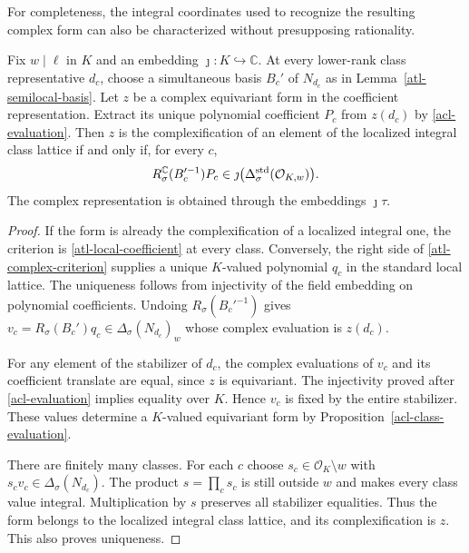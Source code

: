 For completeness, the integral coordinates used to
recognize the resulting complex form can also be
characterized without presupposing rationality.

\begin{proposition}\label{atl-complex-descent}
Fix $w\mid\ell$ in $K$ and an embedding
$\jmath:K\hookrightarrow\mathbb C$.  At every lower-rank
class representative $d_c$, choose a simultaneous
basis $B_c'$ of $N_{d_c}$ as in
Lemma~\ref{atl-semilocal-basis}.  Let $z$ be a complex
equivariant form in the coefficient representation.
Extract its unique polynomial coefficient $P_c$ from
$z(d_c)$ by \eqref{acl-evaluation}.  Then $z$ is the
complexification of an element of the localized integral
class lattice if and only if, for every $c$,
\begin{equation}\label{atl-complex-criterion}
 R_\sigma^{\mathbb C}(B_c'^{-1})P_c
      \in\jmath\bigl(\Delta_\sigma^{\rm std}
                                        (\mathcal O_{K,w})\bigr).
\end{equation}
The complex representation is obtained through the
embeddings $\jmath\tau$.
\end{proposition}
\begin{proof}
If the form is already the complexification of a
localized integral one, the criterion is
\eqref{atl-local-coefficient} at every class.
Conversely, the right side of
\eqref{atl-complex-criterion} supplies a unique
$K$-valued polynomial $q_c$ in the standard local
lattice.  The uniqueness follows from injectivity
of the field embedding on polynomial coefficients.
Undoing $R_\sigma(B_c'^{-1})$ gives
$v_c=R_\sigma(B_c')q_c\in\Delta_\sigma(N_{d_c})_w$
whose complex evaluation is $z(d_c)$.

For any element of the stabilizer of $d_c$, the
complex evaluations of $v_c$ and its coefficient
translate are equal, since $z$ is equivariant.
The injectivity proved after \eqref{acl-evaluation}
implies equality over $K$.  Hence $v_c$ is fixed
by the entire stabilizer.  These values determine
a $K$-valued equivariant form by
Proposition~\ref{acl-class-evaluation}.

There are finitely many classes.  For each $c$ choose
$s_c\in\mathcal O_K\setminus w$ with
$s_cv_c\in\Delta_\sigma(N_{d_c})$.  The product
$s=\prod_cs_c$ is still outside $w$ and makes every
class value integral.  Multiplication by $s$ preserves
all stabilizer equalities.  Thus the form belongs to
the localized integral class lattice, and its
complexification is $z$.  This also proves uniqueness.
\end{proof}


